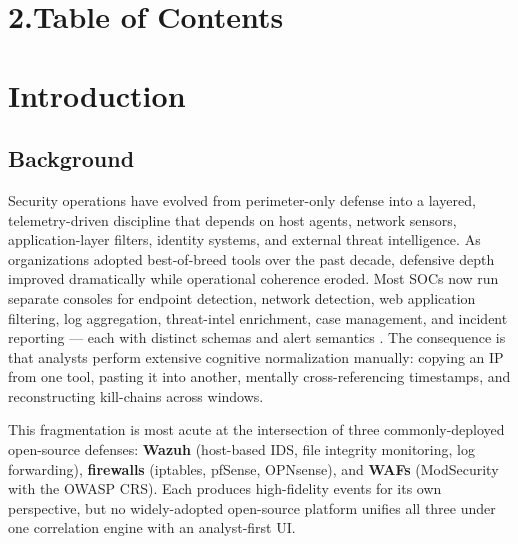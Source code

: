 \documentclass[11pt,a4paper]{article}
\renewcommand{\contentsname}{\textcolor{tr1Blue}{Contents}}
\begin{document}
\newpage
\thispagestyle{fancy}
\section*{\textcolor{tr1Blue}{\Large 2.\quad Table of Contents}}
\label{sec:toc}
\renewcommand{\contentsname}{}
\vspace{0.3cm}
\begingroup
\let\clearpage\relax
\tableofcontents
\endgroup
\setcounter{section}{2}

\newpage
\section{Introduction}
\label{sec:introduction}

\subsection{Background}
Security operations have evolved from perimeter-only defense into a layered, telemetry-driven discipline that depends on host agents, network sensors, application-layer filters, identity systems, and external threat intelligence. As organizations adopted best-of-breed tools over the past decade, defensive depth improved dramatically while operational coherence eroded. Most SOCs now run separate consoles for endpoint detection, network detection, web application filtering, log aggregation, threat-intel enrichment, case management, and incident reporting — each with distinct schemas and alert semantics \cite{sans2024survey}. The consequence is that analysts perform extensive cognitive normalization manually: copying an IP from one tool, pasting it into another, mentally cross-referencing timestamps, and reconstructing kill-chains across windows.

This fragmentation is most acute at the intersection of three commonly-deployed open-source defenses: \textbf{Wazuh} (host-based IDS, file integrity monitoring, log forwarding), \textbf{firewalls} (iptables, pfSense, OPNsense), and \textbf{WAFs} (ModSecurity with the OWASP CRS). Each produces high-fidelity events for its own perspective, but no widely-adopted open-source platform unifies all three under one correlation engine with an analyst-first UI.
\end{document}
